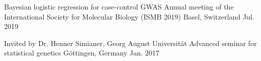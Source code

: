 


\begin{cventries}


\cventry
{Bayesian logistic regression for case-control GWAS} %
{Annual meeting of the International Society for Molecular Biology (ISMB 2019)} %
{Basel, Switzerland} %
{Jul. 2019} %
{ %
}


\cventry
{Invited by Dr. Henner Simianer, Georg August Universit{\"a}t} %
{Advanced seminar for statistical genetics} %
{G{\"o}ttingen, Germany} %
{Jan. 2017} %
{ %
}


\end{cventries}
